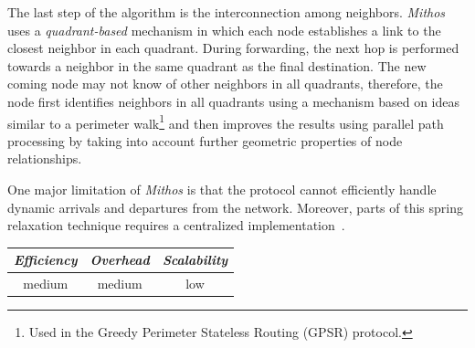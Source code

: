 The last step of the algorithm is the interconnection among neighbors. \emph{Mithos}
uses a \emph{quadrant-based} mechanism in which each node establishes
a link to the closest neighbor in each quadrant. During forwarding, the next
hop is performed towards a neighbor in the same quadrant as the final
destination. The new coming node may not know of other neighbors in all
quadrants, therefore, the node first identifies neighbors in all quadrants
using a mechanism based on ideas similar to a perimeter walk\footnote{Used in
the Greedy Perimeter Stateless Routing (GPSR) protocol.} and then improves the
results using parallel path processing by taking into account further geometric
properties of node relationships.

One major limitation of \emph{Mithos} is that the protocol cannot efficiently handle
dynamic arrivals and departures from the network. Moreover, parts of this spring
relaxation technique requires a centralized
implementation~\cite{cox_vivaldi_2004}.



\begin{center}
\begin{tabular}{ccc}
\emph{Efficiency} & \emph{Overhead} & \emph{Scalability} \\
\hline
medium &
medium &
low
\end{tabular}
\end{center}

